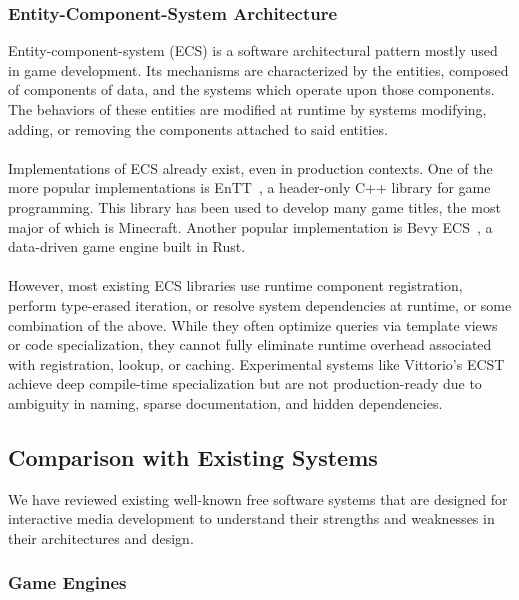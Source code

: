 \subsubsection*{Entity-Component-System Architecture}

Entity-component-system (ECS) is a software architectural pattern mostly used in game development.
Its mechanisms are characterized by the entities, composed of components of data,
and the systems which operate upon those components.
The behaviors of these entities are modified at runtime by systems modifying, adding, or removing the components
attached to said entities.
\\\\
Implementations of ECS already exist, even in production contexts.
One of the more popular implementations is EnTT~\cite{ValtoLibraries_EnTT}, a header-only C++ library for game programming.
This library has been used to develop many game titles, the most major of which is Minecraft.
Another popular implementation is Bevy ECS~\cite{Bevy_Engine}, a data-driven game engine built in Rust.
\\\\
However, most existing ECS libraries use runtime component registration, perform type-erased iteration, or resolve
system dependencies at runtime, or some combination of the above.
While they often optimize queries via template views or code specialization, they cannot fully eliminate
runtime overhead associated with registration, lookup, or caching.
Experimental systems like Vittorio's ECST~\cite{vittorio} achieve deep compile-time specialization
but are not production-ready due to ambiguity in naming, sparse documentation, and hidden dependencies.

\subsection{Comparison with Existing Systems}
\label{subsec:comparison-with-existing-systems}

We have reviewed existing well-known free software systems that are designed for interactive media
development to understand their strengths and weaknesses in their architectures and design.

\subsubsection*{Game Engines}

